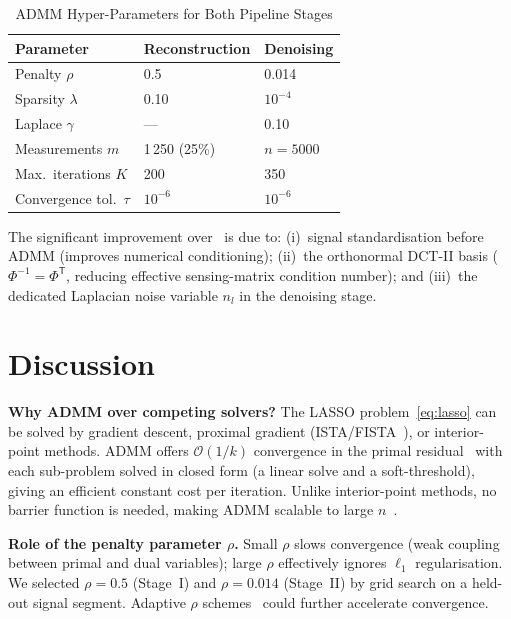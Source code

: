 \documentclass[journal,twoside,10pt]{IEEEtran}
\newcommand{\T}{^{\mathsf{T}}}
\begin{document}
\begin{table}[t]
  \centering
  \caption{ADMM Hyper-Parameters for Both Pipeline Stages}
  \label{tab:admm_params}
  \begin{tabular}{lll}
    \toprule
    \textbf{Parameter} & \textbf{Reconstruction} & \textbf{Denoising}\\
    \midrule
    Penalty $\rho$          & 0.5        & 0.014  \\
    Sparsity $\lambda$       & 0.10       & $10^{-4}$ \\
    Laplace $\gamma$         & ---        & 0.10  \\
    Measurements $m$        & 1\,250 (25\%) & $n=5000$ \\
    Max.\ iterations $K$    & 200        & 350   \\
    Convergence tol.\ $\tau$ & $10^{-6}$ & $10^{-6}$ \\
    \bottomrule
  \end{tabular}
\end{table}

The significant improvement over~\cite{lala2022} is due to: (i)~signal standardisation before ADMM
(improves numerical conditioning); (ii)~the orthonormal DCT-II basis ($\Phi^{-1}=\Phi\T$, reducing
effective sensing-matrix condition number); and (iii)~the dedicated Laplacian noise variable $n_l$ in the
denoising stage.

\section{Discussion}
\label{sec:discussion}

\textbf{Why ADMM over competing solvers?}  The LASSO
problem~\eqref{eq:lasso} can be solved by gradient descent, proximal gradient (ISTA/FISTA~\cite{beck2009}),
or interior-point methods.  ADMM offers $\mathcal{O}(1/k)$ convergence in the primal residual~\cite{boyd2011}
with each sub-problem solved in closed form (a linear solve and a soft-threshold), giving an efficient
constant cost per iteration.  Unlike interior-point methods, no barrier function is needed, making ADMM
scalable to large $n$~\cite{liu2019,wang2019}.

\textbf{Role of the penalty parameter $\rho$.}  Small $\rho$ slows convergence (weak coupling between
primal and dual variables); large $\rho$ effectively ignores $\ell_1$ regularisation.  We selected
$\rho=0.5$ (Stage~I) and $\rho=0.014$ (Stage~II) by grid search on a held-out signal segment.
Adaptive $\rho$ schemes~\cite{boyd2011} could further accelerate convergence.
\end{document}
